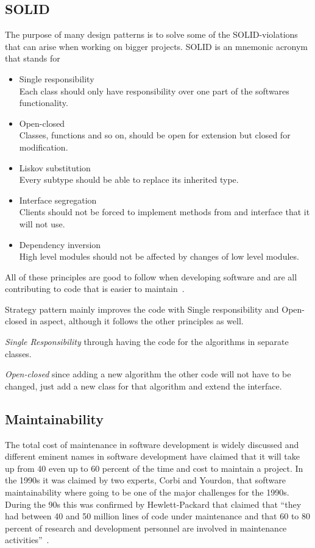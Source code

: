 \documentclass[conference, a4paper]{IEEEtran}
\begin{document}
\subsection{SOLID}
The purpose of many design patterns is to solve some of the SOLID-violations that can arise when working on bigger projects. SOLID is an mnemonic acronym that stands for
\begin{itemize}
    \item Single responsibility \\
    Each class should only have responsibility over one part of the softwares functionality.
    \item Open-closed \\
    Classes, functions and so on, should be open for extension but closed for modification.
    \item Liskov substitution \\
    Every subtype should be able to replace its inherited type.
    \item Interface segregation \\
    Clients should not be forced to implement methods from and interface that it will not use.
    \item Dependency inversion \\
    High level modules should not be affected by changes of low level modules.
\end{itemize}
All of these principles are good to follow when developing software and are all contributing to code that is easier to maintain~\cite{bibitem:Bob}.

Strategy pattern mainly improves the code with Single responsibility and Open-closed in aspect, although it follows the other principles as well.

\textit{Single Responsibility} through having the code for the algorithms in separate classes.

\textit{Open-closed} since adding a new algorithm the other code will not have to be changed, just add a new class for that algorithm and extend the interface.

\subsection{Maintainability}
\label{sec:Maintainability}
The total cost of maintenance in software development is widely discussed and different eminent names in software development have claimed that it will take up from 40 even up to 60 percent of the time and cost to maintain a project. In the 1990s it was claimed by two experts, Corbi and Yourdon, that software maintainability where going to be one of the major challenges for the 1990s. During the 90s this was confirmed by Hewlett-Packard that claimed that ``they had between 40 and 50 million lines of code under maintenance and that 60 to 80 percent of research and development personnel are involved in maintenance activities''~\cite{bibitem:MetricsToEvaluate}.
\end{document}
